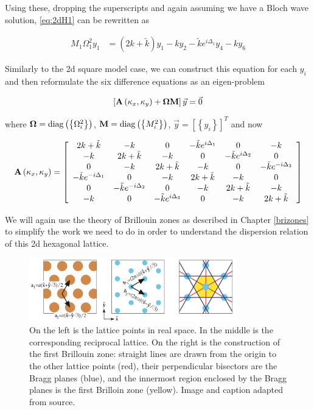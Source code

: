 Using these, dropping the superscripts and again assuming we have a Bloch wave
solution, \eqref{eq:2dH1} can be rewritten as 

\begin{align}
M_1\Omega_1^{2}y_1
      &=\left(2k+\tilde{k}\right)y_1-ky_2-\tilde{k}e^{i\Delta_1}y_4-ky_6
\label{eq:2dH2}
\end{align}

Similarly to the 2d square model case, we can construct this equation for each
$y_i$ and then reformulate the six difference equations as an eigen-problem

\begin{align}
  \left[\mathbf{A}\left(\kappa_{x},\kappa_{y}\right)+\mathbf{\Omega}\mathbf{M}\right]\vec{y}=\vec{0}
\label{eq:hexeig}
\end{align}

where $\mathbf{\Omega}=\operatorname{diag}\left(\left\{\Omega_i^2\right\}\right)$,
$\mathbf{M}=\operatorname{diag}\left(\left\{M_i^2\right\}\right)$,
$\vec{y}=\left[\left\{y_i\right\}\right]^T$ and now

\begin{align}
  \mathbf{A}\left(\kappa_{x},\kappa_{y}\right)=\left[
\begin{array}{cccccc}
2k+\tilde{k} & -k & 0 & -\tilde{k}e^{i\Delta_1} & 0 & -k\\
-k & 2k+\tilde{k} & -k & 0 & -\tilde{k}e^{i\Delta_2} & 0\\
0 & -k & 2k +\tilde{k} & -k & 0 & -\tilde{k}e^{-i\Delta_3}\\
-\tilde{k}e^{-i\Delta_1} & 0 & -k & 2k+\tilde{k} & -k & 0\\
0 & -\tilde{k}e^{-i\Delta_2} & 0 & -k & 2k+\tilde{k} & -k\\
-k & 0 & -\tilde{k}e^{i\Delta_3} & 0 & -k & 2k+\tilde{k}
\end{array}\right]
\end{align}

We will again use the theory of Brillouin zones as described in Chapter
\ref{brizones} to simplify the work we need to do in order to understand the
dispersion relation of this 2d hexagonal lattice.

\begin{figure}[!h]
\centering
\includegraphics[width=0.8\textwidth]{imgs/bzonehex.png}
\caption{\label{fig:bzonehex} On the left is the lattice points in real space.
    In the middle is the corresponding reciprocal lattice. On the right is the
    construction of the first Brillouin zone: straight lines are drawn from the
    origin to the other lattice points (red), their perpendicular bisectors are
    the Bragg planes (blue), and the innermost region enclosed by the Bragg
    planes is the first Brilloin zone (yellow). Image and caption adapted from
    source.\cite{MITnp}}
\end{figure}


